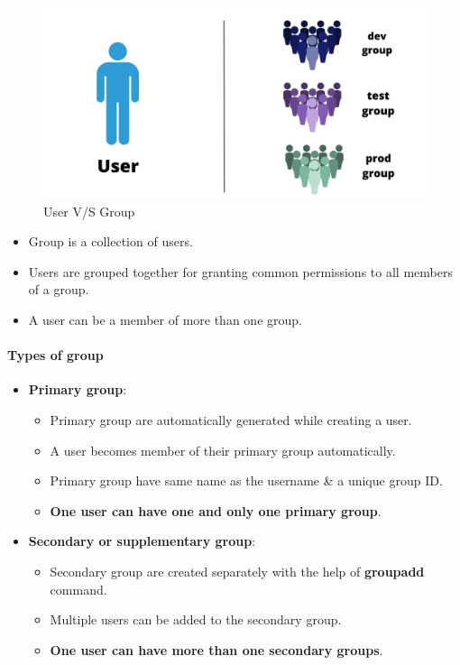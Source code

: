 \setlength{\columnsep}{3pt}
\begin{flushleft}
	\bigskip
	\begin{figure}[h!]
	\centering
	\includegraphics[scale=.2]{content/chapter4/images/user_group.jpg}
	\caption{User V/S Group}
	\label{fig:user_group}
	\end{figure}
	\bigskip

	\begin{itemize}
		\item Group is a collection of users.
		\item Users are grouped together for granting common permissions to all members of a group.
		\item A user can be a member of more than one group.
	\end{itemize}

\newpage
	\paragraph{Types of group}
	
	\begin{itemize}
		\item \textbf{Primary group}:
		\begin{itemize}
			\item Primary group are automatically generated while creating a user.
			\item A user becomes member of their primary group automatically.
			\item Primary group have same name as the username \& a unique group ID.
			\item \textbf{One user can have one and only one primary group}.
		\end{itemize} 
		\item \textbf{Secondary or supplementary group}:
		\begin{itemize}
			\item Secondary group are created separately with the help of \textbf{groupadd} command.
			\item Multiple users can be added to the secondary group.
			\item \textbf{One user can have more than one secondary groups}.
		\end{itemize} 
	\end{itemize}
	

\end{flushleft}
